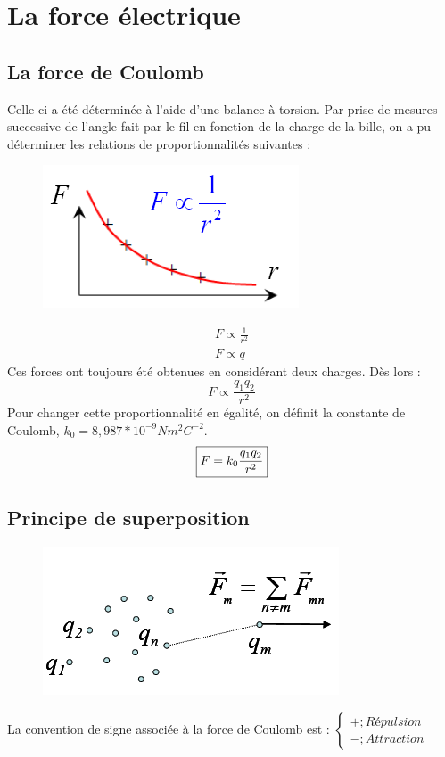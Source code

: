 \documentclass	[11pt, a4paper, openany]{book}
\begin{document}
\section{La force électrique}
\subsection{La force de Coulomb}
Celle-ci a été déterminée à l'aide d'une balance à torsion. Par prise de mesures successive de l'angle fait par le fil en fonction de la charge de la bille, on a pu déterminer les relations de proportionnalités suivantes :
\begin{figure}
	\includegraphics[scale=0.44]{es/image1.png}
\end{figure}
\begin{eqnarray}
	F \propto \frac{1}{r^2}\\
	F \propto q
\end{eqnarray}
Ces forces ont toujours été obtenues en considérant deux charges. Dès lors :
\begin{equation}
	F \propto \frac{q_1q_2}{r^2}
\end{equation}
Pour changer cette proportionnalité en égalité, on définit la constante de Coulomb, $k_0 = 8,987*10^{-9} Nm^2C^{-2}$.
\begin{equation}
	\fbox{$ F = k_0 \dfrac{q_1q_2}{r^2}$}
\end{equation}

\subsection{Principe de superposition}
\begin{figure}
	\includegraphics[scale=0.44]{es/image2.png}
\end{figure}
La convention de signe associée à la force de Coulomb est : $\left\{\begin{array}{l}
+ ; Répulsion\\
- ; Attraction
\end{array}\right.$\\
\end{document}
